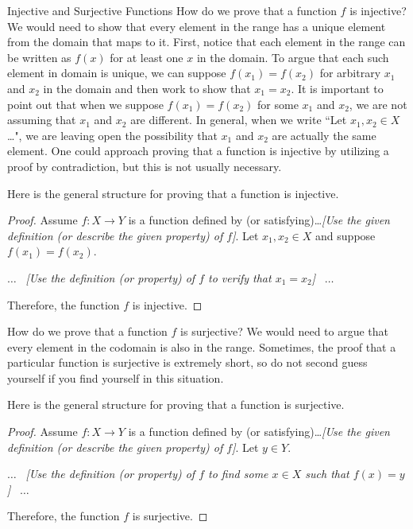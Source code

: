 \begin{section}{Injective and Surjective Functions}
How do we prove that a function $f$ is injective? We would need to show that every element in the range has a unique element from the domain that maps to it. First, notice that each element in the range can be written as $f(x)$ for at least one $x$ in the domain.  To argue that each such element in domain is unique, we can suppose $f(x_{1})=f(x_{2})$ for arbitrary $x_1$ and $x_2$ in the domain and then work to show that $x_{1}=x_{2}$.  It is important to point out that when we suppose $f(x_{1})=f(x_{2})$ for some $x_1$ and $x_2$, we are not assuming that $x_1$ and $x_2$ are different. In general, when we write ``Let $x_1,x_2\in X$\ldots", we are leaving open the possibility that $x_1$ and $x_2$ are actually the same element. One could approach proving that a function is injective by utilizing a proof by contradiction, but this is not usually necessary.

\begin{skeleton}
Here is the general structure for proving that a function is injective.

\begin{mdframed}[style=skeleton]
\begin{proof}
Assume $f:X\to Y$ is a function defined by (or satisfying)\ldots \emph{[Use the given definition (or describe the given property) of $f$]}.  Let $x_1,x_2\in X$ and suppose $f(x_1)=f(x_2)$.
\begin{center}
$\ldots$ \ \emph{[Use the definition (or property) of $f$ to verify that $x_1=x_2$]} \ $\ldots$
\end{center}
\noindent Therefore, the function $f$ is injective.
\end{proof}
\end{mdframed}
\end{skeleton}

How do we prove that a function $f$ is surjective? We would need to argue that every element in the codomain is also in the range.  Sometimes, the proof that a particular function is surjective is extremely short, so do not second guess yourself if you find yourself in this situation.  

\begin{skeleton}
Here is the general structure for proving that a function is surjective.

\begin{mdframed}[style=skeleton]
\begin{proof}
Assume $f:X\to Y$ is a function defined by (or satisfying)\ldots \emph{[Use the given definition (or describe the given property) of $f$]}.  Let $y\in Y$.
\begin{center}
$\ldots$ \ \emph{[Use the definition (or property) of $f$ to find some $x\in X$ such that $f(x)=y$]} \ $\ldots$
\end{center}
\noindent Therefore, the function $f$ is surjective.
\end{proof}
\end{mdframed}
\end{skeleton}


\end{section}
